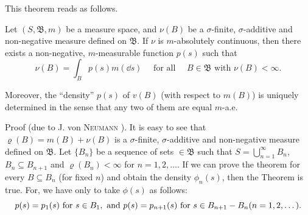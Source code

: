 \label{sec:III.8}

This theorem reads as follows. 

\begin{theoremn} Let $(S, \mathfrak{B}, m)$ be a measure space, and $\nu(B)$ be a $\sigma$-finite, $\sigma$-additive and non-negative measure defined on $\mathfrak{B}$. If $\nu$ is $m$-absolutely continuous, then there exists a non-negative, $m$-measurable function $p(s)$ such that
\begin{equation}\label{eq:III.8.1}
\nu (B) = \int_{B} p (s) m (\dd s) \quad \text{ for all } \quad B \in \mathfrak {B} \text{ with } \nu (B) < \infty .
\end{equation}

Moreover, the ``density'' $p(s)$ of $v(B)$ (with respect to $m(B)$) is uniquely determined in the sense that any two of them are equal $m$-a.e. 
\end{theoremn}

Proof (due to J. von \textsc{Neumann} \cite{neumann229}). It is easy to see that $\varrho(B) = m(B) + \nu(B)$ is a $\sigma$-finite, $\sigma$-additive and non-negative measure defined on $\mathfrak{B}$. Let $\{B_n\}$ be a sequence of sets $\in \mathfrak{B}$ such that $S = \bigcup\limits_{n=1}^{\infty} B_n$, $B_n \subseteq B_{n+1}$ and $\varrho(B_n) < \infty$ for $n = 1, 2, \ldots$. If we can prove the theorem for every $B \subseteq B_n$ (for fixed $n$) and obtain the density $\phi_n(s)$, then the Theorem is true. For, we have only to take $\phi(s)$ as follows: 
\begin{equation}p (s) = p _{1} (s) \text{ for } s \in B _{1}, \text{ and } p (s) = p _{n+1} (s) \text{ for } s \in B _{n+1} - B _{n} (n = 1, 2, \dots). \notag\end{equation}

